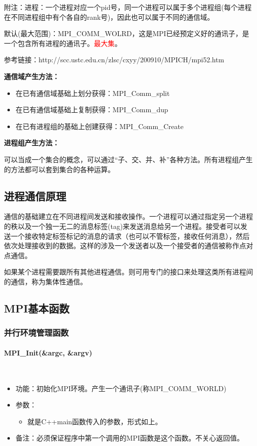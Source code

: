 \documentclass[UTF8]{article}%
\begin{document}
附注：进程：一个进程对应一个pid号，同一个进程可以属于多个进程组(每个进程在不同进程组中有个各自的rank号)，因此也可以属于不同的通信域。

默认(最大范围)：MPI\_COMM\_WOLRD，这是MPI已经预定义好的通讯子，是一个包含所有进程的通讯子。\textcolor{red}{最大集}。

参考链接：http://scc.ustc.edu.cn/zlsc/cxyy/200910/MPICH/mpi52.htm 


\textbf{通信域产生方法：}

\begin{itemize}
    \item 在已有通信域基础上划分获得：MPI\_Comm\_split
    \item 在已有通信域基础上复制获得：MPI\_Comm\_dup
    \item 在已有进程组的基础上创建获得：MPI\_Comm\_Create
\end{itemize}

\textbf{进程组产生方法：}

可以当成一个集合的概念，可以通过“子、交、并、补”各种方法。所有进程组产生的方法都可以套到集合的各种运算。

\subsection{进程通信原理}

通信的基础建立在不同进程间发送和接收操作。一个进程可以通过指定另一个进程的秩以及一个独一无二的消息标签(tag)来发送消息给另一个进程。接受者可以发送一个接收特定标签标记的消息的请求（也可以不管标签，接收任何消息），然后依次处理接收到的数据。这样的涉及一个发送者以及一个接受者的通信被称作点对点通信。

如果某个进程需要跟所有其他进程通信。则可用专门的接口来处理这类所有进程间的通信，称为集体性通信。

\subsection{MPI基本函数}

\subsubsection{并行环境管理函数}

\paragraph{MPI\_Init(\&argc, \&argv)}~{}

\begin{itemize}
    \item 功能：初始化MPI环境。产生一个通讯子(称MPI\_COMM\_WORLD)
    \item 参数：
    {
        \begin{itemize}
            \item 就是C++main函数传入的参数，形式如上。
        \end{itemize}
    }
    \item 备注：必须保证程序中第一个调用的MPI函数是这个函数。不关心返回值。
\end{itemize}
\end{document}

